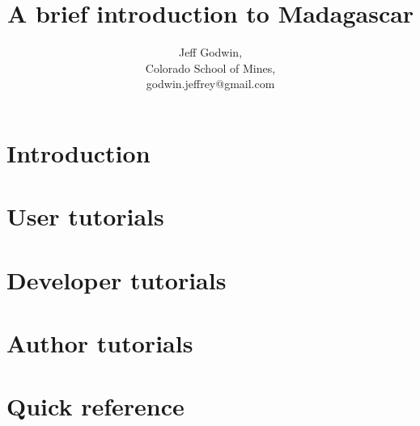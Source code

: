 \title{A brief introduction to Madagascar}
\author{Jeff Godwin, \\
Colorado School of Mines,\\
godwin.jeffrey@gmail.com}
\maketitle

\tableofcontents
\chapter{Introduction}

\chapter{User tutorials}




%
%
%
%

\chapter{Developer tutorials}

\chapter{Author tutorials}


\appendix
\chapter{Quick reference}

